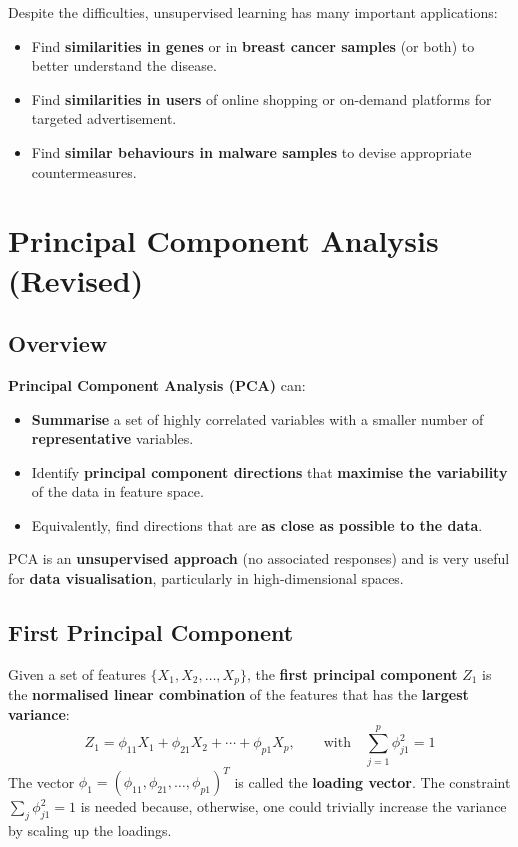\documentclass[11pt,a4paper]{article}
\theoremstyle{definition}
\theoremstyle{plain}
\theoremstyle{remark}
\begin{document}
Despite the difficulties, unsupervised learning has many important applications:
\begin{itemize}
    \item Find \textbf{similarities in genes} or in \textbf{breast cancer samples} (or both) to better understand the disease.
    \item Find \textbf{similarities in users} of online shopping or on-demand platforms for targeted advertisement.
    \item Find \textbf{similar behaviours in malware samples} to devise appropriate countermeasures.
\end{itemize}


\section{Principal Component Analysis (Revised)}

\subsection{Overview}

\textbf{Principal Component Analysis (PCA)} can:
\begin{itemize}
    \item \textbf{Summarise} a set of highly correlated variables with a smaller number of \textbf{representative} variables.
    \item Identify \textbf{principal component directions} that \textbf{maximise the variability} of the data in feature space.
    \item Equivalently, find directions that are \textbf{as close as possible to the data}.
\end{itemize}
PCA is an \textbf{unsupervised approach} (no associated responses) and is very useful for \textbf{data visualisation}, particularly in high-dimensional spaces.

\subsection{First Principal Component}

Given a set of features $\{X_1, X_2, \ldots, X_p\}$, the \textbf{first principal component} $Z_1$ is the \textbf{normalised linear combination} of the features that has the \textbf{largest variance}:
\[
    Z_1 = \phi_{11} X_1 + \phi_{21} X_2 + \cdots + \phi_{p1} X_p, \qquad \text{with} \quad \sum_{j=1}^{p} \phi_{j1}^2 = 1
\]
The vector $\phi_1 = (\phi_{11}, \phi_{21}, \ldots, \phi_{p1})^T$ is called the \textbf{loading vector}. The constraint $\sum_j \phi_{j1}^2 = 1$ is needed because, otherwise, one could trivially increase the variance by scaling up the loadings.
\end{document}

